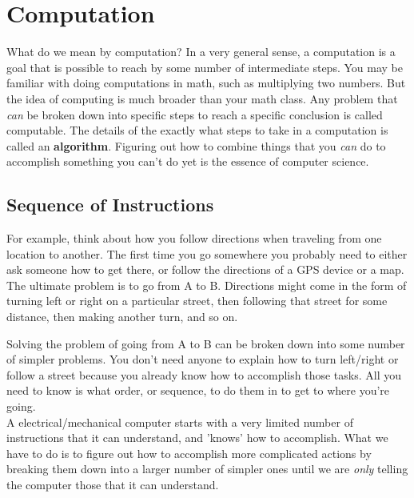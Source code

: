 \chapter{Computation}

What do we mean by computation? In a very general sense, a computation is a goal that is possible to reach by some number of intermediate steps. You may be familiar with doing computations in math, such as multiplying two numbers. But the idea of computing is much broader than your math class. Any problem that \textit{can} be broken down into specific steps to reach a specific conclusion is called computable. The details of the exactly what steps to take in a computation is called an \textbf{algorithm}. Figuring out how to combine things that you \textit{can} do to accomplish something you can't do yet is the essence of computer science.\\

\section{Sequence of Instructions}

For example, think about how you follow directions when traveling from one location to another. The first time you go somewhere you probably need to either ask someone how to get there, or follow the directions of a GPS device or a map. The ultimate problem is to go from A to B. Directions might come in the form of turning left or right on a particular street, then following that street for some distance, then making another turn, and so on.\\


Solving the problem of going from A to B can be broken down into some number of simpler problems. You don't need anyone to explain how to turn left/right or follow a street because you already know how to accomplish those tasks. All you need to know is what order, or sequence, to do them in to get to where you're going.\\

A electrical/mechanical computer starts with a very limited number of instructions that it can understand, and 'knows' how to accomplish. What we have to do is to figure out how to accomplish more complicated actions by breaking them down into a larger number of simpler ones until we are \textit{only} telling the computer those that it can understand.

\begin{center} \end{center}

